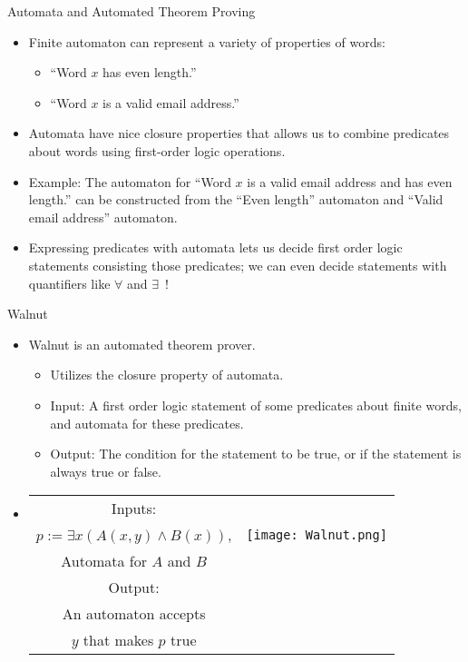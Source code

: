 \documentclass[leqno,presentation]{beamer}
\begin{document}
\begin{frame}{Automata and Automated Theorem Proving}
    \begin{itemize}
        \item Finite automaton can represent a variety of properties of words:
            \begin{itemize}
                \item ``Word $x$ has even length.''
                \item ``Word $x$ is a valid email address.''
            \end{itemize}
            
        \item Automata have nice closure properties that allows us to combine predicates about words using first-order logic operations. 
        \item Example: The automaton for ``Word $x$ is a valid email address and has even length.'' can be constructed from  the  ``Even length'' automaton and ``Valid email address'' automaton.
            
        \item Expressing predicates with automata lets us decide first order logic statements consisting those predicates; we can even decide statements with quantifiers like $\forall$ and $\exists$~!
    \end{itemize}
\end{frame}

\begin{frame}{Walnut}
    \begin{itemize}
        \item Walnut is an automated theorem prover.
        \begin{itemize}
        \item Utilizes the closure property of automata.
        \item Input: A first order logic statement of some predicates about finite words, and automata for these predicates.
        \item Output: The condition for the statement to be true, or if the statement is always true or false.
        \end{itemize}
        \item 
        \begin{tabular}{|c|c}
        \cline{1-1}
        Inputs:                                   & \multirow{3}{*}{\texttt{[image: Walnut.png]}}\\\cline{1-1}
        $p := \exists x (A(x,y) \land B(x))$,      &   \\
        Automata for $A$ and $B$                  &   \\ \cline{1-1}
        Output:                                   &   \\ \cline{1-1}
        An automaton accepts        &   \\
         $y$ that makes $p$ true                       &   \\ \cline{1-1}
        \end{tabular}
        
    \end{itemize}
\end{frame}
\end{document}
